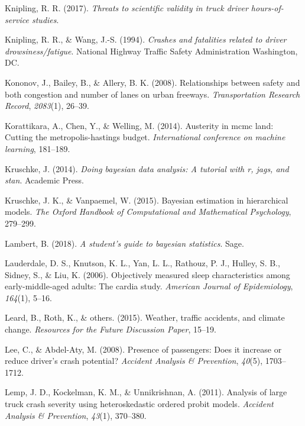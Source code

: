 \documentclass[12pt]{book}
\numberwithin{equation}{chapter}
\begin{document}
\leavevmode\hypertarget{ref-knipling2017threats}{}%
Knipling, R. R. (2017). \emph{Threats to scientific validity in truck driver hours-of-service studies}.

\leavevmode\hypertarget{ref-knipling1994crashes}{}%
Knipling, R. R., \& Wang, J.-S. (1994). \emph{Crashes and fatalities related to driver drowsiness/fatigue}. National Highway Traffic Safety Administration Washington, DC.

\leavevmode\hypertarget{ref-kononov2008relationships}{}%
Kononov, J., Bailey, B., \& Allery, B. K. (2008). Relationships between safety and both congestion and number of lanes on urban freeways. \emph{Transportation Research Record}, \emph{2083}(1), 26--39.

\leavevmode\hypertarget{ref-korattikara2014austerity}{}%
Korattikara, A., Chen, Y., \& Welling, M. (2014). Austerity in mcmc land: Cutting the metropolis-hastings budget. \emph{International conference on machine learning}, 181--189.

\leavevmode\hypertarget{ref-kruschke2014doing}{}%
Kruschke, J. (2014). \emph{Doing bayesian data analysis: A tutorial with r, jags, and stan}. Academic Press.

\leavevmode\hypertarget{ref-kruschke2015bayesian}{}%
Kruschke, J. K., \& Vanpaemel, W. (2015). Bayesian estimation in hierarchical models. \emph{The Oxford Handbook of Computational and Mathematical Psychology}, 279--299.

\leavevmode\hypertarget{ref-lambert2018student}{}%
Lambert, B. (2018). \emph{A student's guide to bayesian statistics}. Sage.

\leavevmode\hypertarget{ref-lauderdale2006objectively}{}%
Lauderdale, D. S., Knutson, K. L., Yan, L. L., Rathouz, P. J., Hulley, S. B., Sidney, S., \& Liu, K. (2006). Objectively measured sleep characteristics among early-middle-aged adults: The cardia study. \emph{American Journal of Epidemiology}, \emph{164}(1), 5--16.

\leavevmode\hypertarget{ref-leard2015weather}{}%
Leard, B., Roth, K., \& others. (2015). Weather, traffic accidents, and climate change. \emph{Resources for the Future Discussion Paper}, 15--19.

\leavevmode\hypertarget{ref-lee2008presence}{}%
Lee, C., \& Abdel-Aty, M. (2008). Presence of passengers: Does it increase or reduce driver's crash potential? \emph{Accident Analysis \& Prevention}, \emph{40}(5), 1703--1712.

\leavevmode\hypertarget{ref-lemp2011analysis}{}%
Lemp, J. D., Kockelman, K. M., \& Unnikrishnan, A. (2011). Analysis of large truck crash severity using heteroskedastic ordered probit models. \emph{Accident Analysis \& Prevention}, \emph{43}(1), 370--380.
\end{document}

